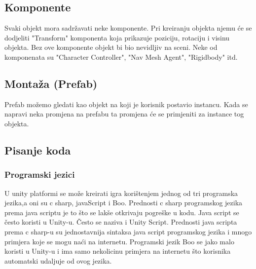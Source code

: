 \subsection{Komponente}
Svaki objekt mora sadržavati neke komponente. Pri kreiranju objekta njemu će se dodjeliti "Transform" komponenta koja prikazuje poziciju, rotaciju i visinu objekta. Bez ove komponente objekt bi bio nevidljiv na sceni. Neke od komponenata su "Character Controller", "Nav Mesh Agent", "Rigidbody" itd.


\subsection{Montaža (Prefab)}
Prefab možemo gledati kao objekt na koji je korisnik postavio instancu. Kada se napravi neka promjena na prefabu ta promjena će se primjeniti za instance tog objekta.

\subsection{Pisanje koda}
\subsubsection{Programski jezici}
U unity platformi se može kreirati igra korištenjem jednog od tri programska jezika,a oni su c sharp, javaScript i Boo. Prednosti c sharp programskog jezika prema java scriptu je to što se lakše otkrivaju pogreške u kodu. Java script se često koristi u Unity-u. Često se naziva i Unity Script. Prednosti java scripta prema c sharp-u su jednostavnija sintaksa java script programskog jezika i mnogo primjera koje se mogu naći na internetu. Programski jezik Boo se jako malo koristi u Unity-u i ima samo nekolicinu primjera na internetu što korisnika automatski udaljuje od ovog jezika. 


